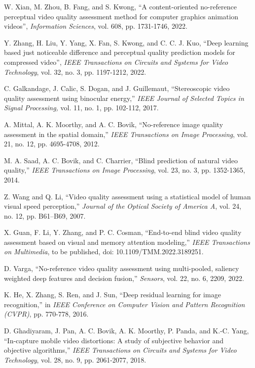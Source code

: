 \documentclass[journal]{IEEEtran}
\begin{document}
\begin{thebibliography}{5}
W. Xian, M. Zhou, B. Fang, and S. Kwong, ``A content-oriented no-reference perceptual video quality assessment method for computer graphics animation videos'', \emph{Information Sciences}, vol. 608, pp. 1731-1746, 2022.

Y. Zhang, H. Liu, Y. Yang, X. Fan, S. Kwong, and C. C. J. Kuo, ``Deep learning based just noticeable difference and perceptual quality prediction models for compressed video'', \emph{IEEE Transactions on Circuits and Systems for Video Technology}, vol. 32, no. 3, pp. 1197-1212, 2022.

C. Galkandage, J. Calic, S. Dogan, and J. Guillemaut, ``Stereoscopic video quality assessment using binocular energy,'' \emph{IEEE Journal of Selected Topics in Signal Processing,} vol. 11, no. 1, pp. 102-112, 2017.

A. Mittal, A. K. Moorthy, and A. C. Bovik, ``No-reference image quality assessment in the spatial domain,'' \emph{IEEE Transactions on Image Processing}, vol. 21, no. 12, pp. 4695-4708, 2012.


M. A. Saad, A. C. Bovik, and C. Charrier, ``Blind prediction of natural video quality,'' \emph{IEEE Transactions on Image Processing}, vol. 23, no. 3, pp. 1352-1365, 2014.

Z. Wang and Q. Li, ``Video quality assessment using a statistical model of human visual speed perception,'' \emph{Journal of the Optical Society of America A}, vol. 24, no. 12, pp. B61–B69, 2007.

X. Guan, F. Li, Y. Zhang, and P. C. Cosman, ``End-to-end blind video quality assessment based on visual and memory attention modeling,'' \emph{IEEE Transactions on Multimedia}, to be published, doi: 10.1109/TMM.2022.3189251.

D. Varga, ``No-reference video quality assessment using multi-pooled, saliency weighted deep features and decision fusion,'' \emph{Sensors}, vol. 22, no. 6, 2209, 2022.




K. He, X. Zhang, S. Ren, and J. Sun, ``Deep residual learning for image recognition,'' in \emph{IEEE Conference on Computer Vision and Pattern Recognition (CVPR)}, pp. 770-778, 2016.



D. Ghadiyaram, J. Pan, A. C. Bovik, A. K. Moorthy, P. Panda, and K.-C. Yang, ``In-capture mobile video distortions: A study of subjective behavior and objective algorithms,'' \emph{IEEE Transactions on Circuits and Systems for Video Technology}, vol. 28, no. 9, pp. 2061-2077, 2018.


\end{thebibliography}
\end{document}
